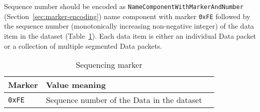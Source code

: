Sequence number should be encoded as \texttt{NameComponentWithMarkerAndNumber} (Section~\ref{sec:marker-encoding}) name component with marker \verb|0xFE| followed by the sequence number (monotonically increasing non-negative integer) of the data item in the dataset (Table~\ref{tab:sequencing}).
Each data item is either an individual Data packet or a collection of multiple segmented Data packets.

\begin{table}[h!]
  \centering
  \caption{Sequencing marker}
  \label{tab:sequencing}
  \begin{tabular}{|l|l|l|}
    \hline
    Marker & Value meaning \\
    \hline \hline
    \verb|0xFE| & Sequence number of the Data in the dataset \\
    \hline
  \end{tabular}
\end{table}


